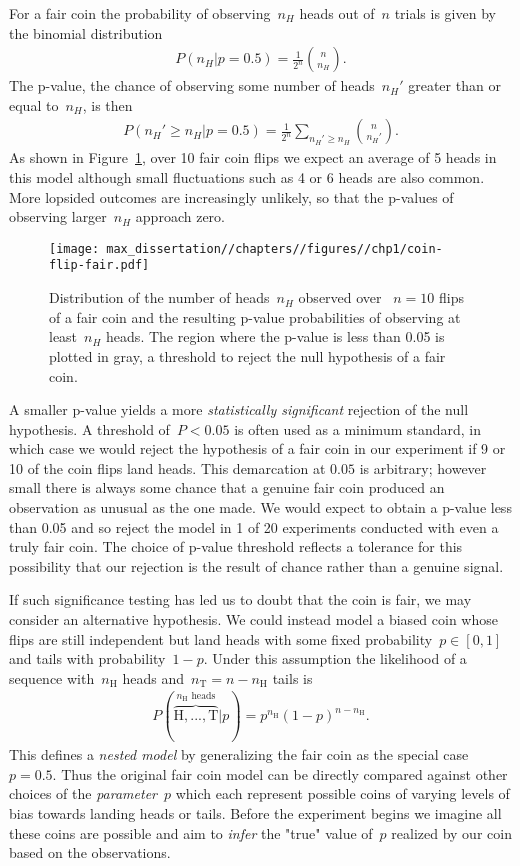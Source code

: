 For a fair coin the probability of observing~$n_H$ heads out of~$n$ trials is given by the binomial distribution \begin{align}
    P(n_H|p = 0.5) = \frac{1}{2^n} \binom{n}{n_H}.
\end{align}
The p-value, the chance of observing some number of heads~$n_H'$ greater than or equal to~$n_H$, is then \begin{align}
    P(n_H' \geq n_H|p = 0.5) = \frac{1}{2^n} \sum_{n_H' \geq n_H} \binom{n}{n_H'}.
\end{align}
As shown in Figure~\ref{fig:coin-flip-fair}, over 10 fair coin flips we expect an average of 5 heads in this model although small fluctuations such as 4 or 6 heads are also common. More lopsided outcomes are increasingly unlikely, so that the p-values of observing larger~$n_H$ approach zero. 

\begin{figure}
    \centering
    \texttt{[image: max\_dissertation//chapters//figures//chp1/coin-flip-fair.pdf]}
    \caption{Distribution of the number of heads~$n_H$ observed over ~$n = 10$ flips of a fair coin and the resulting p-value probabilities of observing at least~$n_H$ heads. The region where the p-value is less than 0.05 is plotted in gray, a threshold to reject the null hypothesis of a fair coin.}
    \label{fig:coin-flip-fair}
\end{figure}

A smaller p-value yields a more \emph{statistically significant} rejection of the null hypothesis. A threshold of~$P < 0.05$ is often used as a minimum standard, in which case we would reject the hypothesis of a fair coin in our experiment if 9 or 10 of the coin flips land heads. This demarcation at $0.05$ is arbitrary; however small there is always some chance that a genuine fair coin produced an observation as unusual as the one made. We would expect to obtain a p-value less than 0.05 and so reject the model in 1 of 20 experiments conducted with even a truly fair coin. The choice of p-value threshold reflects a tolerance for this possibility that our rejection is the result of chance rather than a genuine signal. 

If such significance testing has led us to doubt that the coin is fair, we may consider an alternative hypothesis. We could instead model a biased coin whose flips are still independent but land heads with some fixed probability~$p \in [0,1]$ and tails with probability~$1 - p$. Under this assumption the likelihood of a sequence with~$n_\text{H}$ heads and~$n_\text{T} = n - n_\text{H}$ tails is \begin{align}
P(\overbrace{\text{H},...,\text{T}}^{n_\text{H} \text{ heads}}|p) = p^{n_\text{H}}(1-p)^{n - n_\text{H}}. \label{eq:coin-flip-likelihood}
\end{align}
This defines a \emph{nested model} by generalizing the fair coin as the special case~$p = 0.5$. Thus the original fair coin model can be directly compared against other choices of the \emph{parameter}~$p$ which each represent possible coins of varying levels of bias towards landing heads or tails. Before the experiment begins we imagine all these coins are possible and aim to \emph{infer} the "true" value of~$p$ realized by our coin based on the observations.

